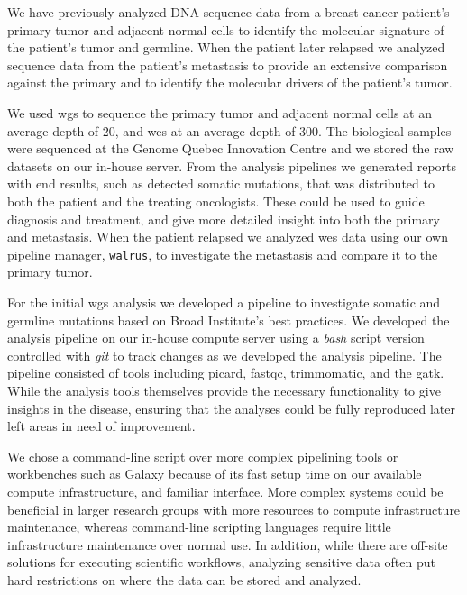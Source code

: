 We have previously analyzed DNA sequence data from a breast cancer patient's
primary tumor and adjacent normal cells to identify the molecular signature of
the patient's tumor and germline. When the patient  later relapsed we analyzed
sequence data from the patient's metastasis to provide an extensive comparison
against the primary and to identify the molecular drivers of the patient's
tumor. 

We used \gls{wgs} to sequence the primary tumor and adjacent normal cells at an
average depth of 20, and \gls{wes} at an average depth of 300. The biological
samples were sequenced at the  Genome Quebec Innovation Centre and we stored the
raw datasets on our in-house server.  From the analysis pipelines we generated
reports with end results, such as detected somatic mutations, that was
distributed to both the patient and the treating oncologists. These could be
used to guide diagnosis and treatment, and give more detailed insight into both
the primary and metastasis.  When the patient relapsed we analyzed \gls{wes}
data using our own pipeline manager, \texttt{walrus}, to investigate the
metastasis and compare it to the primary tumor. 

For the initial \gls{wgs} analysis we developed a pipeline to investigate
somatic and germline mutations based on Broad Institute's best practices. We
developed the analysis pipeline on our in-house compute server using a
\emph{bash} script version controlled with \emph{git} to track changes as we
developed the analysis pipeline. The pipeline consisted of tools including
picard\cite{picard}, fastqc\cite{fastqc}, trimmomatic\cite{trimmomatic}, and the
\gls{gatk}.\cite{gatk} While the analysis tools themselves provide the necessary
functionality to give insights in the disease, 
ensuring that the analyses could be fully reproduced later left areas in need of
improvement.

We chose a command-line script over more complex pipelining tools or workbenches
such as Galaxy\cite{goecks2010galaxy} because of its fast setup time on our
available compute infrastructure, and familiar interface. More complex systems
could be beneficial in larger research groups with more resources to compute
infrastructure maintenance, whereas command-line scripting languages require
little infrastructure maintenance over normal use. In addition, while there are
off-site solutions for executing scientific workflows, analyzing sensitive data
often put hard restrictions on where the data can be stored and analyzed.

